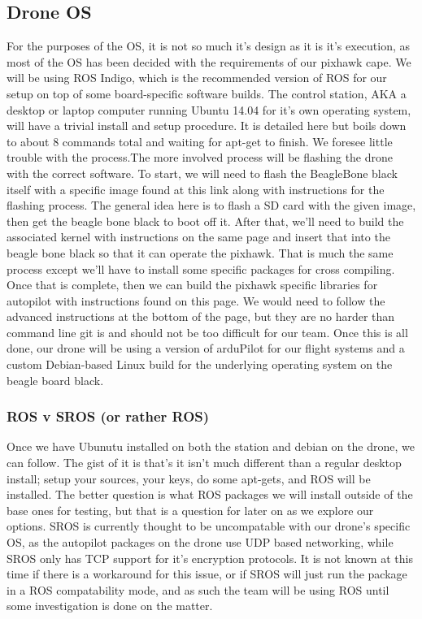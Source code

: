 \documentclass[IEEEtran,letterpaper,10pt,notitlepage,draftclsnofoot,onecolumn]{article}
\begin{document}
\subsection{Drone OS}
For the purposes of the OS, it is not so much it's design as it is it's execution, as most of the OS has been decided with
the requirements of our pixhawk cape. We will be using ROS Indigo, which is the recommended version of ROS for our setup on top 
of some board-specific software builds. The control station, AKA a desktop or laptop computer running Ubuntu 14.04 for it's own 
operating system, will have a trivial install and setup procedure. It is detailed here\cite{Indigo} but boils down to about 8 
commands total and waiting for apt-get to finish. We foresee little trouble with the process.The more involved process will be 
flashing the drone with the correct software. To start, we will need to flash the BeagleBone black itself with a specific image 
found at this link along with instructions for the flashing process\cite{buildingBBB}. The general idea here is to flash a SD 
card with the given image, then get the beagle bone black to boot off it. After that, we'll need to build the associated kernel 
with instructions on the same page and insert that into the beagle bone black so that it can operate the pixhawk. That is much 
the same process except we'll have to install some specific packages for cross compiling. Once that is complete, then we can 
build the pixhawk specific libraries for autopilot with instructions found on this page\cite{buildingPX}. We would need to 
follow the advanced instructions at the bottom of the page, but they are no harder than command line git is and should not be 
too difficult for our team. Once this is all done, our drone will be using a version of arduPilot for our flight systems and a 
custom Debian-based Linux build for the underlying operating system on the beagle board black.

\subsubsection{ROS v SROS (or rather ROS)}
Once we have Ubunutu installed on both the station and debian on the drone, we can follow\cite{Indigo}.
The gist of it is that's it isn't much different than a regular desktop install; setup your sources, your keys, do some 
apt-gets, and ROS will be installed. The better question is what ROS packages we will install outside of the base ones for 
testing, but that is a question for later on as we explore our options. SROS is currently thought to be uncompatable with
our drone's specific OS, as the autopilot packages on the drone use UDP based networking, while SROS only has TCP support for 
it's encryption protocols. It is not known at this time if there is a workaround for this issue, or if SROS will just run the 
package in a ROS compatability mode, and as such the team will be using ROS until some investigation is done on the matter.
\end{document}
